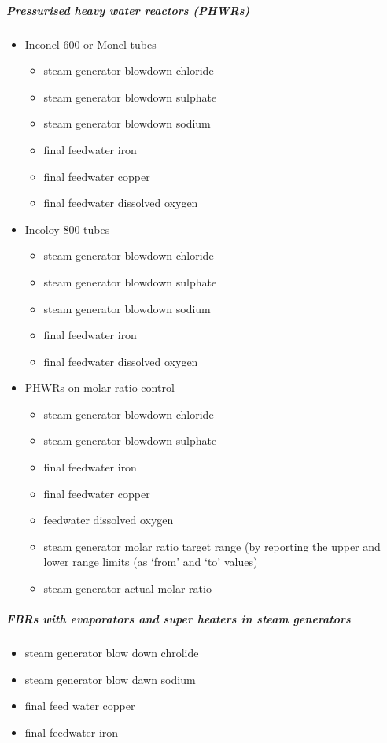 \subparagraph{Pressurised heavy water reactors (PHWRs)}
\begin{itemize}
\item Inconel-600 or Monel tubes
\begin{itemize}
\item steam generator blowdown chloride
\item steam generator blowdown sulphate
\item steam generator blowdown sodium
\item final feedwater iron
\item final feedwater copper
\item final feedwater dissolved oxygen
\end{itemize}
\item Incoloy-800 tubes
\begin{itemize}
\item steam generator blowdown chloride
\item steam generator blowdown sulphate
\item steam generator blowdown sodium
\item final feedwater iron
\item final feedwater dissolved oxygen
\end{itemize}
\item PHWRs on molar ratio control
\begin{itemize}
\item steam generator blowdown chloride
\item steam generator blowdown sulphate
\item final feedwater iron
\item final feedwater copper
\item feedwater dissolved oxygen
\item steam generator molar ratio target range (by reporting the upper and lower range limits (as ‘from’ and ‘to’ values)
\item steam generator actual molar ratio
\end{itemize}
\end{itemize}

\subparagraph{FBRs with evaporators and super heaters in steam
  generators}
\begin{itemize}
\item steam generator blow down chrolide
\item steam generator blow dawn sodium
\item final feed water copper
\item final feedwater iron
\end{itemize}

